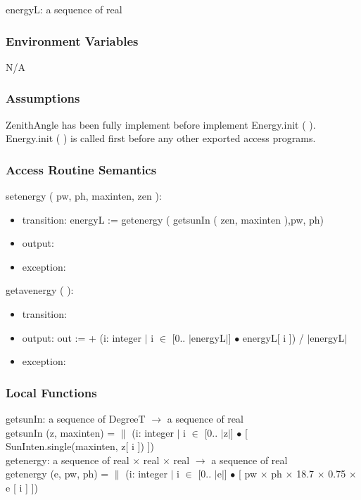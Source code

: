 \documentclass[12pt, titlepage]{article}
\begin{document}
energyL: a sequence of real\\

\subsubsection{Environment Variables}

N/A

\subsubsection{Assumptions}
ZenithAngle has been fully implement before implement Energy.init ( ).\\
Energy.init ( ) is called first before any other exported access programs.\\


\subsubsection{ Access Routine Semantics}

\noindent  setenergy ( pw, ph, maxinten, zen ):
\begin{itemize}
\item transition:
energyL := getenergy ( getsunIn ( zen, maxinten ),pw, ph)
\item output:
 
\item exception: 
\end{itemize}

\noindent  getavenergy ( ):
\begin{itemize}
\item transition: 
\item output: out := + (i: integer $|$ i $\in$ [0.. $|$energyL$|$] $\bullet$  energyL[ i ]) / $|$energyL$|$
\item exception: 
\end{itemize}


\subsubsection{Local Functions}
getsunIn: a sequence of DegreeT $\rightarrow$ a sequence of real\\
getsunIn (z, maxinten) = $\|$ (i: integer $|$ i $\in$ [0.. $|$z$|$] $\bullet$ [ SunInten.single(maxinten, z[ i ]) ])\\

getenergy: a sequence of real $\times$ real $\times$ real $\rightarrow$ a sequence of real\\
getenergy (e, pw, ph) =  $\|$ (i: integer $|$ i $\in$ [0.. $|$e$|$] $\bullet$ [ pw $\times$ ph $\times$ 18.7 $\times$ 0.75 $\times$ e [ i ] ])
\end{document}
